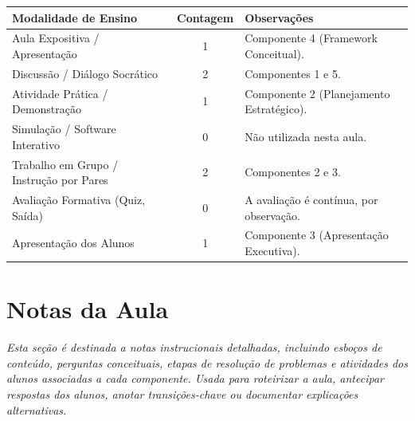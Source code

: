 \documentclass{lesson_plan}
\begin{document}
\vspace{0.5cm}

\begin{center}
\renewcommand{\arraystretch}{1.4}
\begin{tabular}{|p{6cm}|c|p{10cm}|}
\hline
\textbf{Modalidade de Ensino} & \textbf{Contagem} & \textbf{Observações} \\
\hline
Aula Expositiva / Apresentação & 1 & Componente 4 (Framework Conceitual). \\
\hline
Discussão / Diálogo Socrático & 2 & Componentes 1 e 5. \\
\hline
Atividade Prática / Demonstração & 1 & Componente 2 (Planejamento Estratégico). \\
\hline
Simulação / Software Interativo & 0 & Não utilizada nesta aula. \\
\hline
Trabalho em Grupo / Instrução por Pares & 2 & Componentes 2 e 3. \\
\hline
Avaliação Formativa (Quiz, Saída) & 0 & A avaliação é contínua, por observação. \\
\hline
Apresentação dos Alunos & 1 & Componente 3 (Apresentação Executiva). \\
\hline
\end{tabular}
\end{center}

\vspace{1cm}
\newpage

\section{Notas da Aula}
\textit{
Esta seção é destinada a notas instrucionais detalhadas, incluindo esboços de conteúdo, perguntas conceituais, etapas de resolução de problemas e atividades dos alunos associadas a cada componente. Usada para roteirizar a aula, antecipar respostas dos alunos, anotar transições-chave ou documentar explicações alternativas.}
\end{document}
